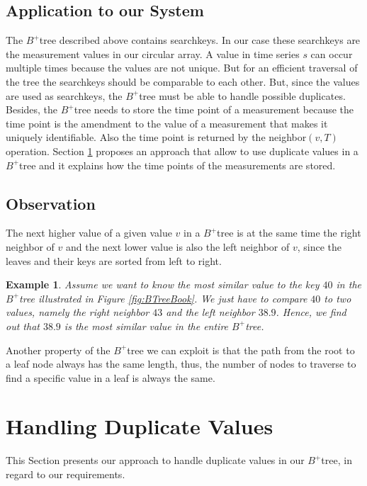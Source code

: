 \documentclass[abstracton,12pt]{scrreprt}
\newtheorem{example}{Example}
\begin{document}
\subsection{Application to our System}
The $B^+$tree described above contains searchkeys. In our case these searchkeys are the measurement values in our circular array. A value in time series $s$ can occur multiple times because the values are not unique. But for an efficient traversal of the tree the searchkeys should be comparable to each other. But, since the values are used as searchkeys, the $B^+$tree must be able to handle possible duplicates. Besides, the $B^+$tree needs to store the time point of a measurement because the time point is the amendment to the value of a measurement that makes it uniquely identifiable. Also the time point is returned by the neighbor$(v,T)$ operation. Section \ref{sec:allowDV} proposes an approach that allow to use duplicate values in a $B^+$tree and it explains how the time points of the measurements are stored. 

\subsection{Observation}
The next higher value of a given value $v$ in a $B^+$tree is at the same time the right neighbor of $v$ and the next lower value is also the left neighbor of $v$, since the leaves and their keys are sorted from left to right.
\begin{example}
	Assume we want to know the most similar value to the key $40$ in the $B^+$tree illustrated in Figure \ref{fig:BTreeBook}. We just have to compare $40$ to two values, namely the right neighbor $43$ and the left neighbor $38.9$. Hence, we find out that $38.9$ is the most similar value in the entire $B^+$tree. 
\end{example}
Another property of the $B^+$tree we can exploit is that the path from the root to a leaf node always has the same length, thus, the number of nodes to traverse to find a specific value in a leaf is always the same. 

\section{Handling Duplicate Values}
\label{sec:allowDV}
This Section presents our approach to handle duplicate values in our $B^+$tree, in regard to our requirements. 
\end{document}
